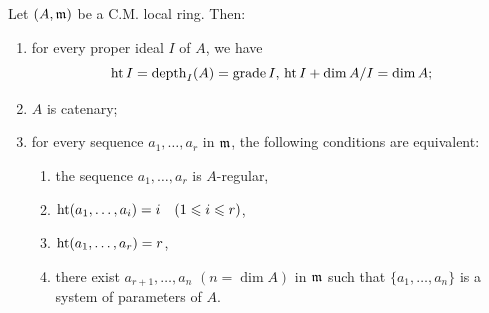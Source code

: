 \documentclass[../main]{subfiles}
\begin{document}
\begin{partheorem}\label{thm:031}
Let $(A, \mathfrak{m})$ be a C.M. local ring. Then:
\begin{enumerate}[label=\roman*)]
    \item for every proper ideal $I$ of $A$, we have \[\operatorname{ht} I=\operatorname{depth}_I(A)=\operatorname{grade} I,\, \operatorname{ht} I+\operatorname{dim} A / I=\operatorname{dim} A;\]
    \item $A$ is catenary;
    \item for every sequence $a_1, \ldots, a_r$ in $\mathfrak{m}$, the following conditions are equivalent:
    \begin{enumerate}[label=(\arabic*)]
        \item the sequence $a_1, \ldots, a_r$ is $A$-regular,
        \item $\Ht (a_1, \ldots, a_i)=i\for{1 \leqslant i \leqslant r}$,
        \item $\operatorname{ht}(a_1, \dots, a_r)=r$,
        \item there exist $a_{r+1}, \ldots, a_n$ $(n=\dim A)$ in $\mathfrak{m}$ such that $\{a_1, \ldots, a_n\}$ is a system of parameters of $A$.
    \end{enumerate}
\end{enumerate}
\end{partheorem}
\end{document}
